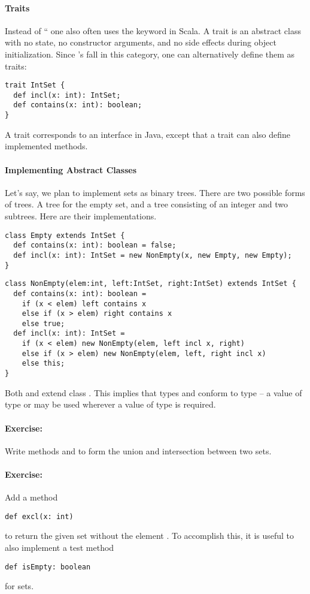 \documentclass[a4paper,12pt,twoside,titlepage]{book}
\newcommand{\exercise}{\paragraph{Exercise:}}
\begin{document}
\paragraph{Traits}

Instead of `` one also often uses the keyword
 in Scala. A trait is an abstract class with no state, no
constructor arguments, and no side effects during object
initialization.  Since 's fall in this category, one can
alternatively define them as traits:
\begin{lstlisting}
trait IntSet {
  def incl(x: int): IntSet;
  def contains(x: int): boolean;
}
\end{lstlisting}
A trait corresponds to an interface in Java, except
that a trait can also define implemented methods.  

\paragraph{Implementing Abstract Classes}

Let's say, we plan to implement sets as binary trees.  There are two
possible forms of trees. A tree for the empty set, and a tree
consisting of an integer and two subtrees. Here are their
implementations.

\begin{lstlisting}
class Empty extends IntSet {
  def contains(x: int): boolean = false;
  def incl(x: int): IntSet = new NonEmpty(x, new Empty, new Empty);
}
\end{lstlisting}

\begin{lstlisting}
class NonEmpty(elem:int, left:IntSet, right:IntSet) extends IntSet {
  def contains(x: int): boolean = 
    if (x < elem) left contains x
    else if (x > elem) right contains x
    else true;
  def incl(x: int): IntSet = 
    if (x < elem) new NonEmpty(elem, left incl x, right)
    else if (x > elem) new NonEmpty(elem, left, right incl x)
    else this;
}
\end{lstlisting}
Both  and  extend class
.  This implies that types  and
 conform to type  -- a value of type  or  may be used wherever a value of type  is required.

\exercise Write methods  and  to form
the union and intersection between two sets.

\exercise Add a method 
\begin{lstlisting}
def excl(x: int)
\end{lstlisting}
to return the given set without the element . To accomplish this,
it is useful to also implement a test method
\begin{lstlisting}
def isEmpty: boolean
\end{lstlisting}
for sets.
\end{document}
